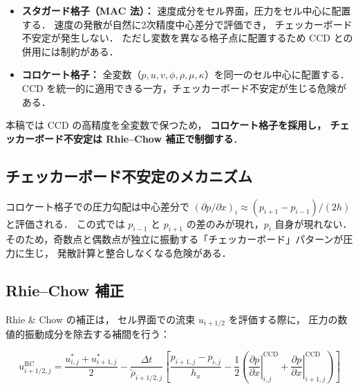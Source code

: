 \documentclass[12pt, a4paper, titlepage]{article}
\newcommand{\jp}[1]{{\normalfont\jpfont #1}}
\begin{document}
\begin{itemize}
  \item \jp{\textbf{スタガード格子（MAC 法）：}
        速度成分をセル界面，圧力をセル中心に配置する．
        速度の発散が自然に2次精度中心差分で評価でき，
        チェッカーボード不安定が発生しない．
        ただし変数を異なる格子点に配置するため CCD との併用には制約がある．}

  \item \jp{\textbf{コロケート格子：}
        全変数（$p, u, v, \phi, \rho, \mu, \kappa$）を同一のセル中心に配置する．
        CCD を統一的に適用できる一方，チェッカーボード不安定が生じる危険がある．}
\end{itemize}

\jp{本稿では CCD の高精度を全変数で保つため，
\textbf{コロケート格子を採用し，
チェッカーボード不安定は Rhie--Chow 補正で制御する}．}

\subsection{\jp{チェッカーボード不安定のメカニズム}}

\jp{コロケート格子での圧力勾配は中心差分で
$(\partial p/\partial x)_i \approx (p_{i+1}-p_{i-1})/(2h)$ と評価される．
この式では $p_{i-1}$ と $p_{i+1}$ の差のみが現れ，$p_i$ 自身が現れない．
そのため，奇数点と偶数点が独立に振動する「チェッカーボード」パターンが圧力に生じ，
発散計算と整合しなくなる危険がある．}

\subsection{Rhie--Chow \jp{補正}}

\jp{Rhie \& Chow \cite{RhieChow1983} の補正は，
セル界面での流束 $u_{i+1/2}$ を評価する際に，
圧力の数値的振動成分を除去する補間を行う：}
\begin{tcolorbox}[mybox, title={Rhie--Chow \jp{補正速度（セル界面，2次元）}}]
\begin{equation}
  u_{i+1/2,j}^{\mathrm{RC}}
  = \frac{u^*_{i,j} + u^*_{i+1,j}}{2}
  - \frac{\Delta t}{\tilde\rho_{i+1/2,j}}
    \!\left[
      \frac{p_{i+1,j} - p_{i,j}}{h_x}
      - \frac{1}{2}\!\left(
        \left.\frac{\partial p}{\partial x}\right|_{i,j}^{\mathrm{CCD}}
        + \left.\frac{\partial p}{\partial x}\right|_{i+1,j}^{\mathrm{CCD}}
      \right)
    \right]
  \label{eq:rhie_chow}
\end{equation}
\end{tcolorbox}
\end{document}
